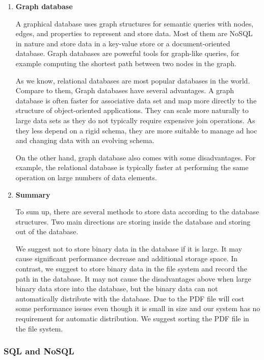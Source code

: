 \begin{enumerate}
	
	\item\textbf{Graph database}
	\setlength{\parindent}{1em}
	
	A graphical database uses graph structures for semantic queries with nodes, edges, and properties to represent and store data. Most of them are NoSQL in nature and store data in a key-value store or a document-oriented database. Graph databases are powerful tools for graph-like queries, for example computing the shortest path between two nodes in the graph.
	
	As we know, relational databases are most popular databases in the world. Compare to them, Graph databases have several advantages. A graph database is often faster for associative data set and map more directly to the structure of object-oriented applications. They can scale more naturally to large data sets as they do not typically require expensive join operations. As they less depend on a rigid schema, they are more suitable to manage ad hoc and changing data with an evolving schema.
	
	On the other hand, graph database also comes with some disadvantages. For example, the relational database is typically faster at performing the same operation on large numbers of data elements.
	
	\item\textbf{Summary}
	\setlength{\parindent}{1em}
	
    To sum up, there are several methods to store data according to the database structures. Two main directions are storing inside the database and storing out of the database.
    
    We suggest not to store binary data in the database if it is large. It may cause significant performance decrease and additional storage space. In contrast, we suggest to store binary data in the file system and record the path in the database. It may not cause the disadvantages above when large binary data store into the database, but the binary data can not automatically distribute with the database. Due to the PDF file will cost some performance issues even though it is small in size and our system has no requirement for automatic distribution. We suggest sorting the PDF file in the file system.
	
\end{enumerate}

\subsubsection{SQL and NoSQL}
	
